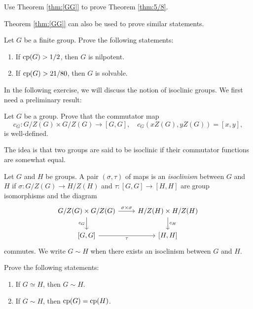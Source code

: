 \begin{exercise}
    \label{xca:5/8}
    Use Theorem \ref{thm:[GG]} to prove Theorem \ref{thm:5/8}.
\end{exercise}

Theorem \ref{thm:[GG]} 
can also be used to
prove similar statements. 

\begin{exercise}
    \label{xca:cp_NS}
    Let $G$ be a finite group. Prove the following statements:
    \begin{enumerate}
        \item If $\operatorname{cp}(G)>1/2$, then $G$ is nilpotent.
        \item If $\operatorname{cp}(G)>21/80$, then $G$ is solvable. 
    \end{enumerate}
\end{exercise}

In the following exercise, we will discuss the notion 
of isoclinic groups. We first need
a preliminary result:

\begin{exercise}
\label{xca:commutator_map}
    Let $G$ be a group. Prove that the commutator map
    \[
    c_G\colon G/Z(G)\times G/Z(G)\to [G,G],
    \quad
    c_G(xZ(G),yZ(G))=[x,y],
    \]
    is well-defined. 
\end{exercise}

The idea is that two groups are said to be isoclinic 
if their commutator functions are somewhat equal. 

\begin{exercise}
\label{xca:isoclinism}
    Let $G$ and $H$ be groups. 
    A pair $(\sigma,\tau)$ of maps is an \emph{isoclinism}
    between $G$ and $H$ if 
    $\sigma\colon G/Z(G)\to H/Z(H)$ and  
    $\tau\colon [G,G]\to [H,H]$ are group isomorphisms and 
    the diagram
    \begin{equation}
    \label{eq:isoclinism}
    \begin{tikzcd}
	{G/Z(G)\times G/Z(G)} & {H/Z(H)\times H/Z(H)} \\
	{[G,G]} & {[H,H]}
	\arrow["{\sigma\times\sigma }", from=1-1, to=1-2]
	\arrow["{c_H}", from=1-2, to=2-2]
	\arrow["{c_G}"', from=1-1, to=2-1]
	\arrow["\tau"', from=2-1, to=2-2]
    \end{tikzcd}
    \end{equation} 
    commutes. We write $G\sim H$ when there exists 
    an isoclinism between $G$ and $H$. 
    
    Prove the following statements:
    \begin{enumerate}
        \item If $G\simeq H$, then $G\sim H$.
        \item If $G\sim H$, then $\operatorname{cp}(G)=\operatorname{cp}(H)$. 
    \end{enumerate}
\end{exercise}

